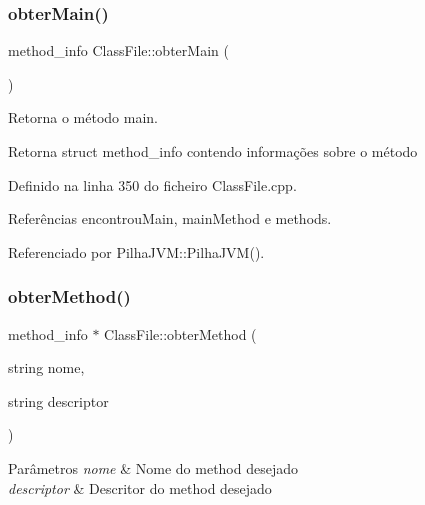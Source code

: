 \mbox{\label{classClassFile_afdbe9cc2f360e04273470202c4f247dc}} 
\subsubsection{\texorpdfstring{obter\+Main()}{obterMain()}}
{\footnotesize\ttfamily method\+\_\+info Class\+File\+::obter\+Main (\begin{DoxyParamCaption}{ }\end{DoxyParamCaption})}



Retorna o método main. 

\begin{DoxyReturn}{Retorna}
struct method\+\_\+info contendo informações sobre o método 
\end{DoxyReturn}


Definido na linha 350 do ficheiro Class\+File.\+cpp.



Referências encontrou\+Main, main\+Method e methods.



Referenciado por Pilha\+J\+V\+M\+::\+Pilha\+J\+V\+M().

\mbox{\label{classClassFile_aac49e7e39f677987b53fdf15787b8106}} 
\subsubsection{\texorpdfstring{obter\+Method()}{obterMethod()}}
{\footnotesize\ttfamily method\+\_\+info $\ast$ Class\+File\+::obter\+Method (\begin{DoxyParamCaption}\item[{string}]{nome,  }\item[{string}]{descriptor }\end{DoxyParamCaption})}


\begin{DoxyParams}{Parâmetros}
{\em nome} & Nome do method desejado \\
\hline
{\em descriptor} & Descritor do method desejado \\
\hline
\end{DoxyParams}


